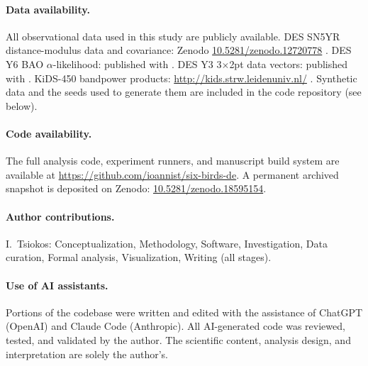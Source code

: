 \documentclass[11pt]{article}
\theoremstyle{definition}
\theoremstyle{plain}
\theoremstyle{remark}
\begin{document}
\paragraph{Data availability.}
All observational data used in this study are publicly available.
DES SN5YR distance-modulus data and covariance: Zenodo \href{https://doi.org/10.5281/zenodo.12720778}{10.5281/zenodo.12720778} \cite{DES2024SN5YRData}.
DES Y6 BAO $\alpha$-likelihood: published with \cite{DES2024Y6BAO}.
DES Y3 3$\times$2pt data vectors: published with \cite{DES2022Y3_3x2pt}.
KiDS-450 bandpower products: \url{http://kids.strw.leidenuniv.nl/} \cite{vanUitert2018KiDSGAMA,KiDSDataProducts}.
Synthetic data and the seeds used to generate them are included in the code repository (see below).

\paragraph{Code availability.}
The full analysis code, experiment runners, and manuscript build system are available at \url{https://github.com/ioannist/six-birds-de}.
A permanent archived snapshot is deposited on Zenodo: \href{https://doi.org/10.5281/zenodo.18595154}{10.5281/zenodo.18595154}.

\paragraph{Author contributions.}
I.\ Tsiokos: Conceptualization, Methodology, Software, Investigation, Data curation, Formal analysis, Visualization, Writing (all stages).

\paragraph{Use of AI assistants.}
Portions of the codebase were written and edited with the assistance of ChatGPT (OpenAI) and Claude Code (Anthropic). All AI-generated code was reviewed, tested, and validated by the author. The scientific content, analysis design, and interpretation are solely the author's.

\appendix
\end{document}
